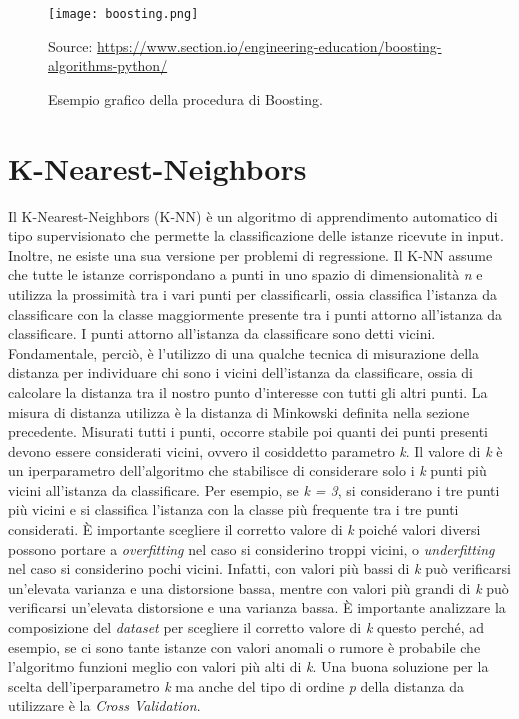 \begin{figure}[h]
	\begin{center}
		\texttt{[image: boosting.png]}
		\caption{Esempio grafico della procedura di Boosting.
		} 
		Source: \url{https://www.section.io/engineering-education/boosting-algorithms-python/}\label{fig:boosting}
	\end{center}
\end{figure}

\section{K-Nearest-Neighbors}
Il K-Nearest-Neighbors (K-NN) \autocite{dasarathy1991nearest} è un algoritmo di apprendimento automatico di tipo supervisionato che permette la classificazione delle istanze ricevute in input. Inoltre, ne esiste una sua versione per problemi di regressione. Il K-NN assume che tutte le istanze corrispondano a punti in uno spazio di dimensionalità \emph{n} e utilizza la prossimità tra i vari punti per classificarli, ossia classifica l'istanza da classificare con la classe maggiormente presente tra i punti attorno all'istanza da classificare. I punti attorno all'istanza da classificare sono detti vicini. Fondamentale, perciò, è l'utilizzo di una qualche tecnica di misurazione della distanza per individuare chi sono i vicini dell'istanza da classificare, ossia di calcolare la distanza tra il nostro punto d'interesse con tutti gli altri punti. La misura di distanza utilizza è la distanza di Minkowski definita nella sezione precedente. Misurati tutti i punti, occorre stabile poi quanti dei punti presenti devono essere considerati vicini, ovvero il cosiddetto parametro \emph{k}. Il valore di \emph{k} è un iperparametro dell'algoritmo che stabilisce di considerare solo i \emph{k} punti più vicini all'istanza da classificare. Per esempio, se \emph{k = 3}, si considerano i tre punti più vicini e si classifica l'istanza con la classe più frequente tra i tre punti considerati. È importante scegliere il corretto valore di \emph{k} poiché valori diversi possono portare a \emph{overfitting} nel caso si considerino troppi vicini, o \emph{underfitting} nel caso si considerino pochi vicini. Infatti, con valori più bassi di \emph{k} può verificarsi un'elevata varianza e una distorsione bassa, mentre con valori più grandi di \emph{k} può verificarsi un'elevata distorsione e una varianza bassa. È importante analizzare la composizione del \emph{dataset} per scegliere il corretto valore di \emph{k} questo perché, ad esempio, se ci sono tante istanze con valori anomali o rumore è probabile che l'algoritmo funzioni meglio con valori più alti di \emph{k}. Una buona soluzione per la scelta dell'iperparametro \emph{k} ma anche del tipo di ordine \emph{p} della distanza da utilizzare è la \emph{Cross Validation}.\\
